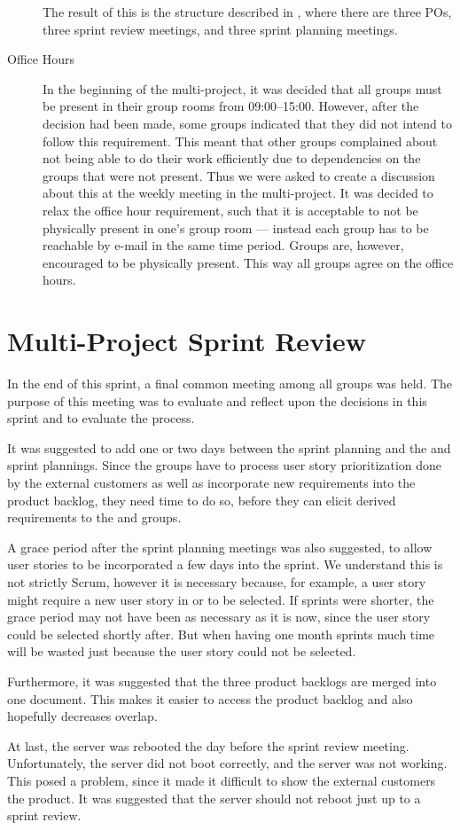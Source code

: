\begin{description}
  The result of this is the structure described in , where there are three POs, three sprint review meetings, and three sprint planning meetings.
  \item[Office Hours] In the beginning of the multi-project, it was decided that all groups must be present in their group rooms from 09:00--15:00. However, after the decision had been made, some groups indicated that they did not intend to follow this requirement. This meant that other groups complained about not being able to do their work efficiently due to dependencies on the groups that were not present. Thus we were asked to create a discussion about this at the weekly meeting in the multi-project. It was decided to relax the office hour requirement, such that it is acceptable to not be physically present in one's group room --- instead each group has to be reachable by e-mail in the same time period. Groups are, however, encouraged to be physically present. This way all groups agree on the office hours.
\end{description}

\section{Multi-Project Sprint Review}\label{sec:s1_multiprj_review}
In the end of this sprint, a final common meeting among all groups was held. The purpose of this meeting was to evaluate and reflect upon the decisions in this sprint and to evaluate the process.

It was suggested to add one or two days between the \gui sprint planning and the \db and \bd sprint plannings. Since the \gui groups have to process user story prioritization done by the external customers as well as incorporate new requirements into the product backlog, they need time to do so, before they can elicit derived requirements to the \db and \bd groups.

A grace period after the sprint planning meetings was also suggested, to allow user stories to be incorporated a few days into the sprint. We understand this is not strictly Scrum, however it is necessary because, for example, a \db user story might require a new user story in \gui or \bd to be selected. If sprints were shorter, the grace period may not have been as necessary as it is now, since the user story could be selected shortly after. But when having one month sprints much time will be wasted just because the user story could not be selected.

Furthermore, it was suggested that the three product backlogs are merged into one document. This makes it easier to access the product backlog and also hopefully decreases overlap.

At last, the server was rebooted the day before the \gui sprint review meeting. Unfortunately, the server did not boot correctly, and the server was not working. This posed a problem, since it made it difficult to show the external customers the product. It was suggested that the server should not reboot just up to a sprint review.
